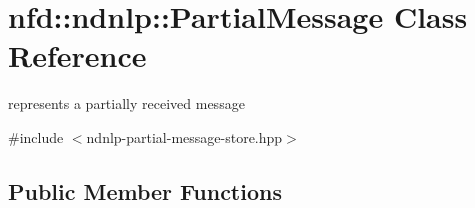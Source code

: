 \hypertarget{classnfd_1_1ndnlp_1_1PartialMessage}{}\section{nfd\+:\+:ndnlp\+:\+:Partial\+Message Class Reference}
\label{classnfd_1_1ndnlp_1_1PartialMessage}


represents a partially received message  




{\ttfamily \#include $<$ndnlp-\/partial-\/message-\/store.\+hpp$>$}

\subsection*{Public Member Functions}
